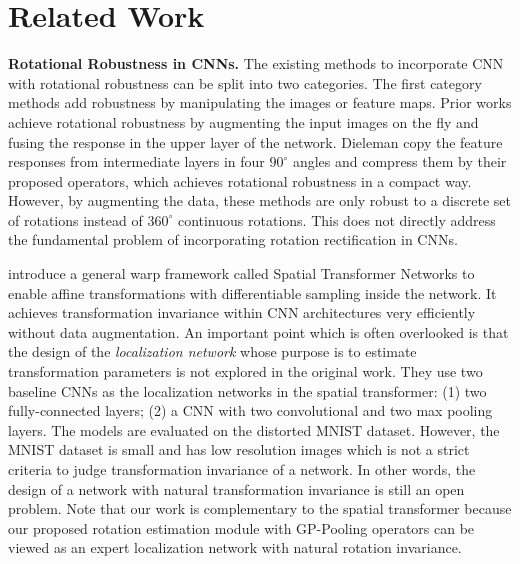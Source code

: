 \documentclass[10pt,twocolumn,letterpaper]{article}
\begin{document}
\section{Related Work}

\noindent\textbf{Rotational Robustness in CNNs.} The existing methods to incorporate CNN with rotational robustness can be split into two categories. The first category methods add robustness by manipulating the images or feature maps. Prior works \cite{Cheng2016, Laptev2016, Henriques2016, Gatica-perez, Laptev2015} achieve rotational robustness by augmenting the input images on the fly and fusing the response in the upper layer of the network. Dieleman \etal \cite{Dieleman2016} copy the feature responses from intermediate layers in four $90^{\circ}$ angles and compress them by their proposed operators, which achieves rotational robustness in a compact way. However, by augmenting the data, these methods are only robust to a discrete set of rotations instead of $360^{\circ}$ continuous rotations. This does not directly address the fundamental problem of incorporating rotation rectification in CNNs.

\cite{Jaderberg2015} introduce a general warp framework called Spatial Transformer Networks to enable affine transformations with differentiable sampling inside the network. It achieves transformation invariance within CNN architectures very efficiently without data augmentation. An important point which is often overlooked is that the design of the \textit{localization network} whose purpose is to estimate transformation parameters is not explored in the original work. They use two baseline CNNs as the localization networks in the spatial transformer: (1) two fully-connected layers; (2) a CNN with two convolutional and two max pooling layers. The models are evaluated on the distorted MNIST dataset. However, the MNIST dataset is small and has low resolution images which is not a strict criteria to judge transformation invariance of a network. In other words, the design of a network with natural transformation invariance is still an open problem. Note that our work is complementary to the spatial transformer because our proposed rotation estimation module with GP-Pooling operators can be viewed as an expert localization network with natural rotation invariance.
\end{document}
